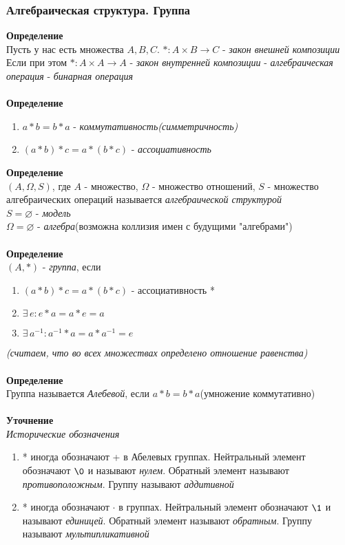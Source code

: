 \documentclass[12pt]{article}
\begin{document}
\subsubsection{Алгебраическая структура. Группа}
\textbf{Определение}\\
Пусть у нас есть множества $A,B,C$. $*: A \times B \rightarrow C$ - \textit{закон внешней композиции}\\
Если при этом $*: A\times A \rightarrow A$ - \textit{закон внутренней композиции} - \textit{алгебраическая операция} - \textit{бинарная операция}\\\\
\textbf{Определение}
\begin{enumerate}
    \item $a*b = b*a$ - \textit{коммутативность(симметричность)}
    \item $(a*b)*c = a*(b*c)$ - \textit{ассоциативность}
\end{enumerate}
\textbf{Определение}\\
$(A,\Omega, S)$, где $A$ - множество, $\Omega$ - множество отношений, $S$ - множество алгебраических операций называется \textit{алгебраической структурой}\\
$S=\varnothing$ - \textit{модель}\\
$\Omega=\varnothing$ - \textit{алгебра}(возможна коллизия имен с будущими "алгебрами")\\\\
\textbf{Определение}\\
$(A,*)$ - \textit{группа}, если
\begin{enumerate}
    \item $(a*b)*c = a*(b*c)$ - ассоциативность *
    \item $\exists\,e: e*a=a*e=a$
    \item $\exists\,a^{-1}: a^{-1}*a=a*a^{-1}=e$
\end{enumerate}
\textit{(считаем, что во всех множествах определено отношение равенства)}\\\\
\textbf{Определение}\\
Группа называется \textit{Алебевой}, если $a*b=b*a$(умножение коммутативно)\\\\
\textbf{Уточнение}\\
\textit{Исторические обозначения}
\begin{enumerate}
    \item * иногда обозначают + в Абелевых группах. Нейтральный элемент обозначают $\0$ и называют \textit{нулем}. Обратный элемент называют \textit{противоположным}. Группу называют \textit{аддитивной}
    \item * иногда обозначают $\cdot$ в группах. Нейтральный элемент обозначают $\1$ и называют \textit{единицей}. Обратный элемент называют \textit{обратным}. Группу называют \textit{мультипликативной}
\end{enumerate}
\end{document}
